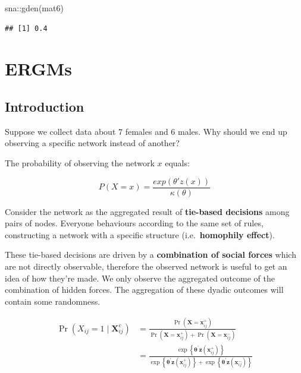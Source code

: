 \documentclass[
  notitlepage,
  onecolumn,
  openany]{book}
\newenvironment{Shaded}{\begin{snugshade}}{\end{snugshade}}
\newcommand{\FunctionTok}[1]{\textcolor[rgb]{0.00,0.00,0.00}{#1}}
\newcommand{\NormalTok}[1]{#1}
\newcommand{\SpecialCharTok}[1]{\textcolor[rgb]{0.00,0.00,0.00}{#1}}
\begin{document}
\begin{Shaded}
\begin{Highlighting}[]
\NormalTok{sna}\SpecialCharTok{::}\FunctionTok{gden}\NormalTok{(mat6)}
\end{Highlighting}
\end{Shaded}

\begin{verbatim}
## [1] 0.4
\end{verbatim}

\hypertarget{ergms}{%
\chapter{ERGMs}\label{ergms}}

\hypertarget{introduction-1}{%
\section{Introduction}\label{introduction-1}}

Suppose we collect data about \(7\) females and \(6\) males. Why should we end up observing a specific network instead of another?

The probability of observing the network \(x\) equals:

\[
P(X=x) = \frac{exp(\theta'z(x))}{\kappa(\theta)}
\]

Consider the network as the aggregated result of \textbf{tie-based decisions} among pairs of nodes. Everyone behaviours according to the same set of rules, constructing a network with a specific structure (i.e.~\textbf{homophily effect}).

These tie-based decisions are driven by a \textbf{combination of social forces} which are not directly observable, therefore the observed network is useful to get an idea of how they're made. We only observe the aggregated outcome of the combination of hidden forces. The aggregation of these dyadic outcomes will contain some randomness.

\[
\begin{aligned}
\operatorname{Pr}\left(X_{i j}=1 \mid \mathbf{X}_{i j}^{c}\right) &=\frac{\operatorname{Pr}\left(\mathbf{X}=\mathbf{x}_{i j}^{+}\right)}{\operatorname{Pr}\left(\mathbf{X}=\mathbf{x}_{i j}^{+}\right)+\operatorname{Pr}\left(\mathbf{X}=\mathbf{x}_{i j}^{-}\right)} \\&=\frac{\exp \left\{\boldsymbol{\theta}^{\prime} \mathbf{z}\left(\mathbf{x}_{i j}^{+}\right)\right\}}{\exp \left\{\boldsymbol{\theta}^{\prime} \mathbf{z}\left(\mathbf{x}_{i j}^{+}\right)\right\}+\exp \left\{\boldsymbol{\theta}^{\prime} \mathbf{z}\left(\mathbf{x}_{i j}^{-}\right)\right\}}
\end{aligned}
\]
\end{document}
